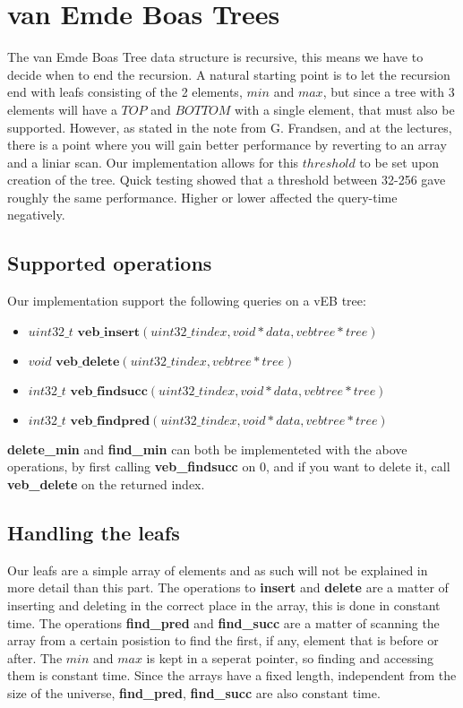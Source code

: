 \section*{van Emde Boas Trees}
The van Emde Boas Tree data structure is recursive, this means we have to decide when to end the recursion. A natural starting point is to let the recursion end with leafs consisting of the 2 elements, $min$ and $max$, but since a tree with 3 elements will have a $TOP$ and $BOTTOM$ with a single element, that must also be supported. However, as stated in the note from G. Frandsen, and at the lectures, there is a point where you will gain better performance by reverting to an array and a liniar scan. Our implementation allows for this $threshold$ to be set upon creation of the tree. Quick testing showed that a threshold between 32-256 gave roughly the same performance. Higher or lower affected the query-time negatively.

\subsection*{Supported operations}
Our implementation support the following queries on a vEB tree:

\begin{itemize}
\item $uint32\_t \textbf{ veb\_insert}(uint32\_t index, void * data, vebtree * tree)$
\item $void \textbf{ veb\_delete}(uint32\_t index, vebtree * tree)$
\item $int32\_t \textbf{ veb\_findsucc}(uint32\_t index, void * data, vebtree *tree)$
\item $int32\_t \textbf{ veb\_findpred}(uint32\_t index, void * data, vebtree *tree)$
\end{itemize}

\textbf{delete\_min} and \textbf{find\_min} can both be implementeted with the above operations, by first calling \textbf{veb\_findsucc} on $0$, and if you want to delete it, call \textbf{veb\_delete} on the returned index.


\subsection*{Handling the leafs}
Our leafs are a simple array of elements and as such will not be explained in more detail than this part. The operations to \textbf{insert} and \textbf{delete} are a matter of inserting and deleting in the correct place in the array, this is done in constant time. The operations \textbf{find\_pred} and \textbf{find\_succ} are a matter of scanning the array from a certain posistion to find the first, if any, element that is before or after. The $min$ and $max$ is kept in a seperat pointer, so finding and accessing them is constant time. Since the arrays have a fixed length, independent from the size of the universe, \textbf{find\_pred}, \textbf{find\_succ} are also constant time.

